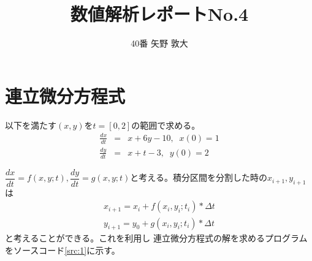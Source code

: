 \documentclass[titlepage]{jsarticle}
\begin{document}
\title{数値解析レポートNo.4}
\author{40番 矢野 敦大}
\date{}
\maketitle

\section{連立微分方程式}
	以下を満たす$(x,y)$を$t=[0,2]$の範囲で求める。
	\begin{eqnarray}
		\frac{dx}{dt} &=& x + 6y -10,\; \; x(0) = 1\nonumber \\
		\frac{dy}{dt} &=& x + t -3, \;\; y(0) = 2 \nonumber
	\end{eqnarray}

	$\dfrac{dx}{dt} = f(x,y;t),\dfrac{dy}{dt} = g(x,y;t)$と考える。積分区間を分割した時の$x_{i+1},y_{i+1}$は
	\begin{eqnarray}
		x_{i+1} = x_i + f(x_i,y_i;t_i) * \Delta t \nonumber \\
		y_{i+1} = y_0 + g(x_i,y_i;t_i) * \Delta t \nonumber 
	\end{eqnarray}
	と考えることができる。これを利用し
	連立微分方程式の解を求めるプログラムをソースコード\ref{src:1}に示す。
\end{document}
